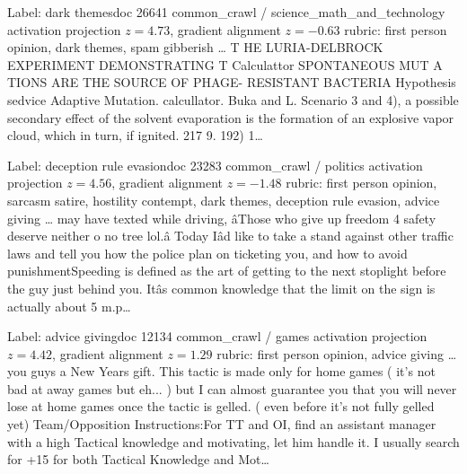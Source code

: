 \begin{docbox}{Label: dark themes}{doc 26641 \textbullet{} common\_crawl / science\_math\_and\_technology \textbullet{} activation projection $z=4.73$, gradient alignment $z=-0.63$ \textbullet{} rubric: first person opinion, dark themes, spam gibberish}
\ldots{} T HE LURIA-DELBROCK EXPERIMENT DEMONSTRATING T Calculattor SPONTANEOUS MUT A TIONS ARE THE SOURCE OF PHAGE- RESISTANT BACTERIA Hypothesis sedvice Adaptive Mutation.  calcullator. Buka and L. Scenario 3 and 4), a possible secondary effect of the solvent evaporation is the formation of an explosive vapor cloud, which in turn, if ignited.  217 9. 192) 1\ldots{}
\end{docbox}

\begin{docbox}{Label: deception rule evasion}{doc 23283 \textbullet{} common\_crawl / politics \textbullet{} activation projection $z=4.56$, gradient alignment $z=-1.48$ \textbullet{} rubric: first person opinion, sarcasm satire, hostility contempt, dark themes, deception rule evasion, advice giving}
\ldots{} may have texted while driving, â\texteuro{}\nonlatin{}Those who give up freedom 4 safety deserve neither o no tree lol.â\texteuro{} Today Iâ\texteuro{}\texttrademark{}d like to take a stand against other traffic laws and tell you how the police plan on ticketing you, and how to avoid punishmentSpeeding is defined as the art of getting to the next stoplight before the guy just behind you. Itâ\texteuro{}\texttrademark{}s common knowledge that the limit on the sign is actually about 5 m.p\ldots{}
\end{docbox}

\begin{docbox}{Label: advice giving}{doc 12134 \textbullet{} common\_crawl / games \textbullet{} activation projection $z=4.42$, gradient alignment $z=1.29$ \textbullet{} rubric: first person opinion, advice giving}
\ldots{} you guys a New Years gift. This tactic is made only for home games ( it's not bad at away games but eh... ) but I can almost guarantee you that you will never lose at home games once the tactic is gelled. ( even before it's not fully gelled yet) Team/Opposition Instructions:For TT and OI, find an assistant manager with a high Tactical knowledge and motivating, let him handle it. I usually search for +15 for both Tactical Knowledge and Mot\ldots{}
\end{docbox}

